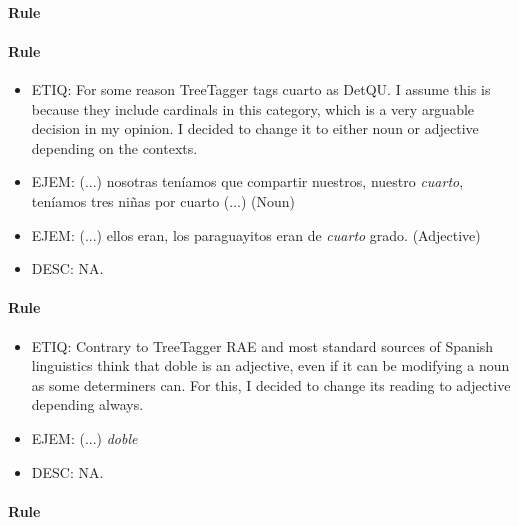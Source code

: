 \documentclass[11pt]{report}
\begin{document}
\paragraph*{Rule}
\paragraph*{Rule}
\begin{itemize}
\item ETIQ: For some reason TreeTagger tags cuarto as DetQU. I assume this is because they include cardinals in this category, which is a very arguable decision in my opinion. I decided to change it to either noun or adjective depending on the contexts. 
\item EJEM: (...) nosotras teníamos que compartir nuestros, nuestro \emph{cuarto}, teníamos tres niñas por cuarto (...)  (Noun)
\item EJEM: (...) ellos eran, los paraguayitos eran de \emph{cuarto} grado. (Adjective)
\item DESC: NA.
\end{itemize}

\paragraph*{Rule}
\begin{itemize}
\item ETIQ: Contrary to TreeTagger RAE and most standard sources of Spanish linguistics think that doble is an adjective, even if it can be modifying a noun as some determiners can. For this, I decided to change its reading to adjective depending always. 
\item EJEM: (...) \emph{doble}
\item DESC: NA.
\end{itemize}

\paragraph*{Rule}
\end{document}
